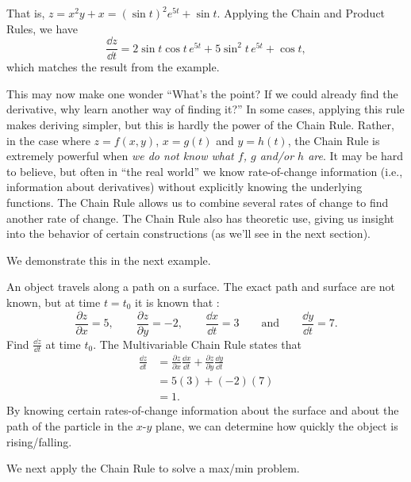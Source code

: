 That is, $z = x^2y+x = (\sin t)^2e^{5t}+\sin t.$ Applying the Chain and Product Rules, we have 
\[\frac{\dd z}{\dd t} = 2\sin t\cos t\, e^{5t}+ 5\sin^2t\,e^{5t}+\cos t,\]
which matches the result from the example.

This may now make one wonder ``What's the point? If we could already find the derivative, why learn another way of finding it?'' In some cases, applying this rule makes deriving simpler, but this is hardly the power of the Chain Rule. Rather, in the case where $z=f(x,y)$, $x=g(t)$ and $y=h(t)$, the Chain Rule is extremely powerful when \emph{we do not know what $f$, $g$ and/or $h$ are}. It may be hard to believe, but often in ``the real world'' we know rate-of-change information (i.e., information about derivatives) without explicitly knowing the underlying functions. The Chain Rule allows us to combine several rates of change to find another rate of change. The Chain Rule also has theoretic use, giving us insight into the behavior of certain constructions (as we'll see in the next section).

We demonstrate this in the next example.

\begin{example}\label{ex_mchain100}%
An object travels along a path on a surface. The exact path and surface are not known, but at time $t=t_0$ it is known that :
\[\frac{\partial z}{\partial x} = 5,\qquad \frac{\partial z}{\partial y}=-2,\qquad \frac{\dd x}{\dd t}=3\qquad \text{and}\qquad \frac{\dd y}{\dd t}=7.\]
Find $\frac{\dd z}{\dd t}$ at time $t_0$.
\solution
The Multivariable Chain Rule states that 
\begin{align*}
\frac{\dd z}{\dd t} &= \frac{\partial z}{\partial x}\frac{\dd x}{\dd t} + \frac{\partial z}{\partial y}\frac{\dd y}{\dd t} \\
				&= 5(3)+(-2)(7) \\
				&=1.
\end{align*}
By knowing certain rates-of-change information about the surface and about the path of the particle in the $x$-$y$ plane, we can determine how quickly the object is rising/falling.
\end{example}

We next apply the Chain Rule to solve a max/min problem.

